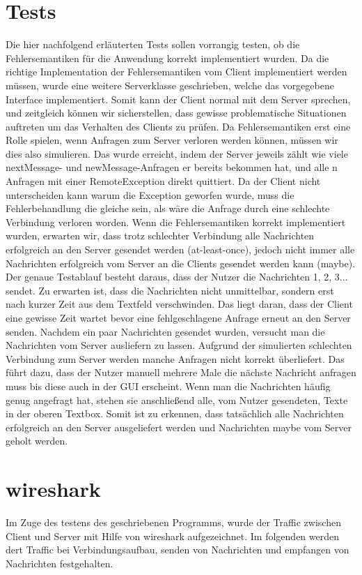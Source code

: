 \documentclass[a4paper, 12pt]{scrartcl}
\begin{document}
\newpage
\section{Tests}
Die hier nachfolgend erläuterten Tests sollen vorrangig testen, ob die Fehlersemantiken für die Anwendung korrekt implementiert wurden.
Da die richtige Implementation der Fehlersemantiken vom Client implementiert werden müssen, wurde eine weitere Serverklasse geschrieben, welche das vorgegebene Interface implementiert. Somit kann der Client normal mit dem Server sprechen, und zeitgleich können wir sicherstellen, dass gewisse problematische Situationen auftreten um das Verhalten des Clients zu prüfen.
Da Fehlersemantiken erst eine Rolle spielen, wenn Anfragen zum Server verloren werden können, müssen wir dies also simulieren. Das wurde erreicht, indem der Server jeweils zählt wie viele \glqq{}nextMessage\grqq{}- und \glqq{}newMessage\grqq{}-Anfragen er bereits bekommen hat, und alle n Anfragen mit einer RemoteException direkt quittiert. Da der Client nicht unterscheiden kann warum die Exception geworfen wurde, muss die Fehlerbehandlung die gleiche sein, als wäre die Anfrage durch eine schlechte Verbindung verloren worden.
Wenn die Fehlersemantiken korrekt implementiert wurden, erwarten wir, dass trotz schlechter Verbindung alle Nachrichten erfolgreich an den Server gesendet werden (\glqq{}at-least-once\grqq{}), jedoch nicht immer alle Nachrichten erfolgreich vom Server an die Clients gesendet werden kann (\glqq{}maybe\grqq{}).
Der genaue Testablauf besteht daraus, dass der Nutzer die Nachrichten \glqq{}1\grqq{}, \glqq{}2\grqq{}, \glqq{}3\grqq{}... sendet. Zu erwarten ist, dass die Nachrichten nicht unmittelbar, sondern erst nach kurzer Zeit aus dem Textfeld verschwinden. Das liegt daran, dass der Client eine gewisse Zeit wartet bevor eine fehlgeschlagene Anfrage erneut an den Server senden.
Nachdem ein paar Nachrichten gesendet wurden, versucht man die Nachrichten vom Server ausliefern zu lassen. Aufgrund der simulierten schlechten Verbindung zum Server werden manche Anfragen nicht korrekt überliefert. Das führt dazu, dass der Nutzer manuell mehrere Male die nächste Nachricht anfragen muss bis diese auch in der GUI erscheint. Wenn man die Nachrichten häufig genug angefragt hat, stehen sie anschließend alle, vom Nutzer gesendeten, Texte in der oberen Textbox.
Somit ist zu erkennen, dass tatsächlich alle Nachrichten erfolgreich an den Server ausgeliefert werden und Nachrichten \glqq{}maybe\grqq{} vom Server geholt werden.

\newpage
\section{wireshark}
Im Zuge des testens des geschriebenen Programms, wurde der Traffic zwischen Client und Server mit Hilfe von wireshark aufgezeichnet. Im folgenden werden dert Traffic bei Verbindungsaufbau, senden von Nachrichten und empfangen von Nachrichten festgehalten.
\end{document}

